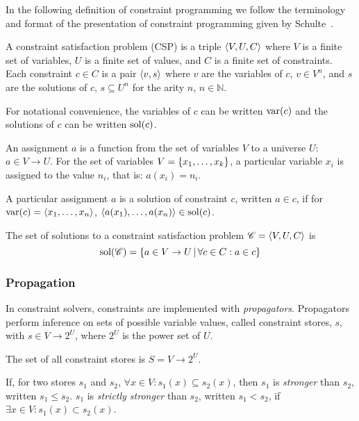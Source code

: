 
In the following definition of constraint programming we follow
the terminology and format of the presentation of 
constraint programming given by Schulte~\cite{lecturenotes}.

A constraint satisfaction problem (CSP) is a triple $\left\langle V,U,C\right\rangle$ where $V$ is a finite set of variables, $U$ is a finite set of values, and $C$ is a finite set of constraints. Each constraint $c \in C$ is a pair $\left\langle v,s\right\rangle$ where $v$ are the variables of $c$, $v \in V^n$, and $s$ are the solutions of $c$, $s \subseteq U^n$ for the arity $n$, $n \in \mathbb{N}$.

For notational convenience, the variables of $c$ can be written $\operatorname{var}(c)$
and
the solutions of $c$ can be written $\operatorname{sol}(c)$.

An assignment $a$ is a function from the set of variables $V$ to a universe $U$: $a \in V \rightarrow U$. 
For the set of variables $V = \left\{x_1,\ldots,x_k\right\}$, a particular variable $x_i$ is assigned to the value $n_i$, that is: $a(x_i) = n_i$. 

A particular assignment $a$ is a solution of constraint $c$, written $a \in c$, if for $\operatorname{var}(c) = \left\langle x_1,\ldots,x_n\right\rangle$, $\left\langle a(x_1),\ldots,a(x_n)\right\rangle \in \operatorname{sol}(c)$.

The set of solutions to a constraint satisfaction problem $\mathscr{C} = \left\langle V,U,C\right\rangle$ is 
\[\operatorname{sol}(\mathscr{C}) = \left\{a \in V \rightarrow U \,\middle|\, \forall c \in C : a \in c \right\}\]

\subsubsection{Propagation}
In constraint solvers, constraints are implemented with \textit{propagators}.
Propagators perform inference on sets of possible variable values, called constraint stores, $s$, with $s \in V \rightarrow 2^U$, where $2^U$ is the power set of $U$.

The set of all constraint stores is $S = V \rightarrow 2^U$.

If, for two stores $s_1$ and $s_2$, $\forall x \in V : s_1(x) \subseteq s_2(x)$, then $s_1$ is \textit{stronger} than $s_2$, written $s_1 \leq s_2$. $s_1$ is \textit{strictly stronger} than $s_2$, written $s_1 < s_2$, if $\exists x \in V : s_1(x) \subset s_2(x)$.

